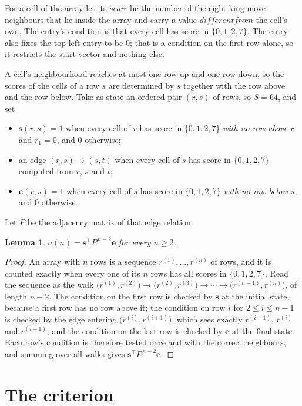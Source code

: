 \documentclass[11pt,a4paper]{article}
\theoremstyle{plain}
\newtheorem{lemma}[theorem]{Lemma}
\theoremstyle{definition}
\begin{document}
For a cell of the array let its \emph{score} be the number of the eight king-move neighbours that lie inside
the array and carry a value $different from$ the cell's own. The entry's condition is that every cell
has score in $\{0,1,2,7\}$. The entry also fixes the top-left entry to be $0$; that is a condition on the first row alone, so it restricts the start vector and nothing else.

A cell's neighbourhood reaches at most one row up and one row down, so the scores of the
cells of a row $s$ are determined by $s$ together with the row above and the row below.
Take as state an ordered pair $(r,s)$ of rows, so $S=64$, and set
\begin{itemize}
\item $\mathbf{s}(r,s)=1$ when every cell of $r$ has score in $\{0,1,2,7\}$ \emph{with no row
above $r$} and $r_1=0$, and $0$ otherwise;
\item an edge $(r,s)\to(s,t)$ when every cell of $s$ has score in $\{0,1,2,7\}$ computed from
$r$, $s$ and $t$;
\item $\mathbf{e}(r,s)=1$ when every cell of $s$ has score in $\{0,1,2,7\}$ \emph{with no row
below $s$}, and $0$ otherwise.
\end{itemize}
Let $P$ be the adjacency matrix of that edge relation.

\begin{lemma}\label{lem:walk}
$a(n)=\mathbf{s}^{\!\top}P^{\,n-2}\mathbf{e}$ for every $n\ge2$.
\end{lemma}

\begin{proof}
An array with $n$ rows is a sequence $r^{(1)},\dots,r^{(n)}$ of rows, and it is counted
exactly when every one of its $n$ rows has all scores in $\{0,1,2,7\}$. Read the sequence as the
walk $\bigl(r^{(1)},r^{(2)}\bigr)\to\bigl(r^{(2)},r^{(3)}\bigr)\to\cdots\to
\bigl(r^{(n-1)},r^{(n)}\bigr)$, of length $n-2$. The condition on the first row is
checked by $\mathbf{s}$ at the initial state, because a first row has no row above it; the
condition on row $i$ for $2\le i\le n-1$ is checked by the edge entering
$\bigl(r^{(i)},r^{(i+1)}\bigr)$, which sees exactly $r^{(i-1)}$, $r^{(i)}$ and
$r^{(i+1)}$; and the condition on the last row is checked by $\mathbf{e}$ at the final
state. Each row's condition is therefore tested once and with the correct neighbours, and
summing over all walks gives $\mathbf{s}^{\!\top}P^{\,n-2}\mathbf{e}$.
\end{proof}

\section{The criterion}
\end{document}
